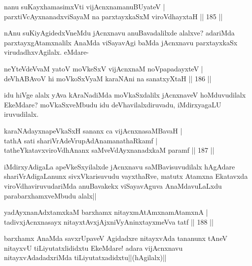 
\begin{shl}
nanu suKayxhamasimxVti vijAcnxnamanuBUyateV |\\
parxtiVcAyxnanadxviSayaM na parxtayxkaSxM viroVdhayxtaH \hfill || 185 ||
\end{shl}

\begin{artha}
nAnu suKiyAgidedxVneMdu jAcnxnavu anuBavadalilxde alalxve? adariMda parxtayxgAtamxnalilx AnaMda viSayavAgi baMda jAcnxnavu parxtayxkaSx virudadhxvAgilalx. eMdare-
\end{artha}


\begin{shl}
neYteVdeVvaM yatoV moVkeSxV vijAcnxnaM noVpapadayxteV |\\
deVhABAvoV hi moVkoSxV\s yaM karaNAni na sanatxyXtaH \hfill || 186 ||
\end{shl}

\begin{artha}
idu hiVge alalx yAva kAraNadiMda moVkaSxdalilx jAcnxnaveV hoMduvudilalx EkeMdare? moVkaSxveMbudu idu deVhavilalxdiruvadu, iMdirxyagaLU iruvudilalx. 
\end{artha}

\begin{shl}
karaNAdayxnapeVkaSxH sananx ca vijAcnxnasaMBavaH |\\
tathA sati shariVrAdeVrupAdAnamanathaRkamf |\\
tatheYkatavxviroVdhAnanx saMveVdAyxnanadxkaM paramf \hfill || 187 ||
\end{shl}

\begin{artha}
iMdirxyAdigaLa apeVkeSxyilalxde jAcnxnavu saMBavisuvudilalx hAgAdare shariVrAdigaLanunx sivxVkarisuvudu vayxthaRve, matutx Atamxna Ekatavxda viroVdhaviruvudariMda anuBavakekx viSayavAguva AnaMdavuLaLxdu parabarxhamxveMbudu alalx|| 
\end{artha}%


\begin{shl}
yadAyxnanAdxtamxkaM barxhamx nitayxmAtAmxnamAtamxnA |\\
tadivxjAcnxnasayx nitayxtAvxjAjxniVyAninxtayxmeVva tatf \hfill || 188 ||
\end{shl}

\begin{artha}
barxhamx AnaMda savxrUpaveV Agidadxre nitayxvAda tananunx tAneV nitayxvU tiLiyutatxlididxtu EkeMdare! adara vijAcnxnavu nitayxvAdadadxriMda tiLiyutatxadidxtu||(hAgilalx)||
\end{artha}

